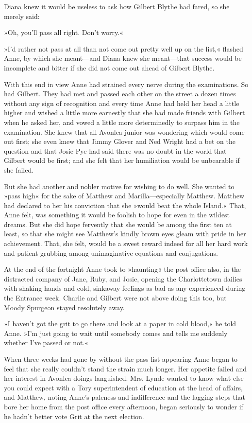 Diana knew it would be useless to ask how Gilbert Blythe had fared, so she merely said:

»Oh, you'll pass all right. Don't worry.«

»I'd rather not pass at all than not come out pretty well up on the list,« flashed Anne, by which she meant—and Diana knew she meant—that success would be incomplete and bitter if she did not come out ahead of Gilbert Blythe.

With this end in view Anne had strained every nerve during the examinations. So had Gilbert. They had met and passed each other on the street a dozen times without any sign of recognition and every time Anne had held her head a little higher and wished a little more earnestly that she had made friends with Gilbert when he asked her, and vowed a little more determinedly to surpass him in the examination. She knew that all Avonlea junior was wondering which would come out first; she even knew that Jimmy Glover and Ned Wright had a bet on the question and that Josie Pye had said there was no doubt in the world that Gilbert would be first; and she felt that her humiliation would be unbearable if she failed.

But she had another and nobler motive for wishing to do well. She wanted to »pass high« for the sake of Matthew and Marilla—especially Matthew. Matthew had declared to her his conviction that she »would beat the whole Island.« That, Anne felt, was something it would be foolish to hope for even in the wildest dreams. But she did hope fervently that she would be among the first ten at least, so that she might see Matthew's kindly brown eyes gleam with pride in her achievement. That, she felt, would be a sweet reward indeed for all her hard work and patient grubbing among unimaginative equations and conjugations.

At the end of the fortnight Anne took to »haunting« the post office also, in the distracted company of Jane, Ruby, and Josie, opening the Charlottetown dailies with shaking hands and cold, sinkaway feelings as bad as any experienced during the Entrance week. Charlie and Gilbert were not above doing this too, but Moody Spurgeon stayed resolutely away.

»I haven't got the grit to go there and look at a paper in cold blood,« he told Anne. »I'm just going to wait until somebody comes and tells me suddenly whether I've passed or not.«

When three weeks had gone by without the pass list appearing Anne began to feel that she really couldn't stand the strain much longer. Her appetite failed and her interest in Avonlea doings languished. Mrs. Lynde wanted to know what else you could expect with a Tory superintendent of education at the head of affairs, and Matthew, noting Anne's paleness and indifference and the lagging steps that bore her home from the post office every afternoon, began seriously to wonder if he hadn't better vote Grit at the next election.


